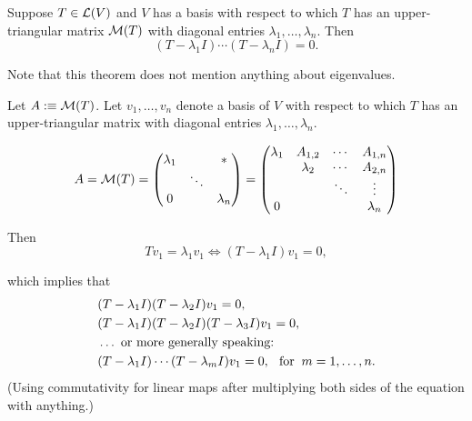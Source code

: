 \begin{thm}
  \label{thm: equation satisfied by operator with upper triangular matrix}
  Suppose $T\in \mathcal{L}(V)$ and $V$ has a basis with respect to which $T$ has an upper-triangular matrix $\mathcal{M}(T)$ with diagonal entries $\lambda_1, \dots, \lambda_n$. Then
  \begin{equation}
    (T-\lambda_1I) \cdots (T-\lambda_nI)=0.
  \end{equation}

  Note that this theorem does not mention anything about eigenvalues.
\end{thm}
\begin{prf}
  Let $A :\equiv \mathcal{M}(T)$. Let $v_1, \ldots, v_n$ denote a basis of $V$ with respect to which $T$  has an upper-triangular matrix with diagonal entries $\lambda_1, \ldots, \lambda_n$.

  \begin{minipage}{\linewidth}
  \begin{equation}
    A = \mathcal{M}(T)
    =
    \begin{pmatrix}
        \lambda_1 &         &  * \\
                  &  \ddots &    \\
        0         &         & \lambda_n
    \end{pmatrix}
    =
    \begin{pmatrix}
       \lambda_1&  A_{1,2}  &  \cdots &  A_{1,n} \\
                & \lambda_2 &  \cdots &  A_{2,n} \\
                &           &  \ddots &  \vdots  \\
          0     &           &         & \lambda_n
    \end{pmatrix}
  \end{equation}
  \end{minipage}

  Then
  \begin{equation}
    \label{i-need-a-ref}
    T v_1 = \lambda_1 v_1 \iff (T-\lambda_1 I)  v_1 = 0,
  \end{equation}

  which implies that
  \begin{equation}
\begin{aligned}
    &(T-\lambda_1 I)(T-\lambda_2 I)  v_1 =0, \\
    &(T-\lambda_1 I)(T-\lambda_2 I)(T-\lambda_3 I)  v_1 =0, \\
    &\ldots \text{ or more generally speaking:} \\
    &(T-\lambda_1 I) \cdots (T-\lambda_m I) v_1 = 0,
     \;\;\, \text{for}\;\; m = 1, \ldots, n.
\end{aligned}
  \end{equation}
  (Using commutativity for linear maps after multiplying both sides of the equation with anything.)
  \bigbreak


\end{prf}
